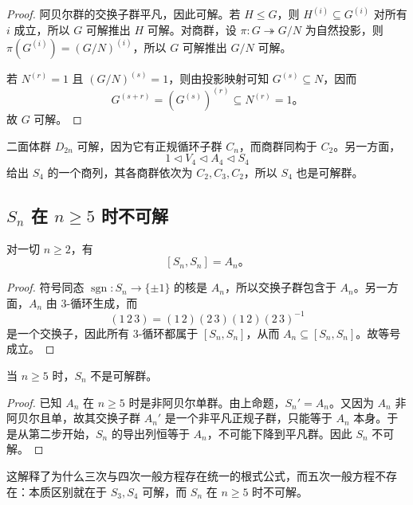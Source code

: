 \begin{proof}
阿贝尔群的交换子群平凡，因此可解。若 $H\le G$，则 $H^{(i)}\subseteq G^{(i)}$ 对所有 $i$ 成立，所以 $G$ 可解推出 $H$ 可解。对商群，设 $\pi:G\twoheadrightarrow G/N$ 为自然投影，则 $\pi(G^{(i)})=(G/N)^{(i)}$，所以 $G$ 可解推出 $G/N$ 可解。

若 $N^{(r)}=1$ 且 $(G/N)^{(s)}=1$，则由投影映射可知 $G^{(s)}\subseteq N$，因而
\[
G^{(s+r)}=(G^{(s)})^{(r)}\subseteq N^{(r)}=1。
\]
故 $G$ 可解。
\end{proof}

\begin{example}
二面体群 $D_{2n}$ 可解，因为它有正规循环子群 $C_n$，而商群同构于 $C_2$。另一方面，
\[
1\lhd V_4\lhd A_4\lhd S_4
\]
给出 $S_4$ 的一个商列，其各商群依次为 $C_2,C_3,C_2$，所以 $S_4$ 也是可解群。
\end{example}

\subsection*{$S_n$ 在 $n\ge5$ 时不可解}

\begin{proposition}
对一切 $n\ge2$，有
\[
[S_n,S_n]=A_n。
\]
\end{proposition}

\begin{proof}
符号同态 $\operatorname{sgn}:S_n\to\{\pm1\}$ 的核是 $A_n$，所以交换子群包含于 $A_n$。另一方面，$A_n$ 由 3-循环生成，而
\[
(1\,2\,3)=(1\,2)(2\,3)(1\,2)(2\,3)^{-1}
\]
是一个交换子，因此所有 3-循环都属于 $[S_n,S_n]$，从而 $A_n\subseteq[S_n,S_n]$。故等号成立。
\end{proof}

\begin{theorem}
当 $n\ge5$ 时，$S_n$ 不是可解群。
\end{theorem}

\begin{proof}
已知 $A_n$ 在 $n\ge5$ 时是非阿贝尔单群。由上命题，$S_n'=A_n$。又因为 $A_n$ 非阿贝尔且单，故其交换子群 $A_n'$ 是一个非平凡正规子群，只能等于 $A_n$ 本身。于是从第二步开始，$S_n$ 的导出列恒等于 $A_n$，不可能下降到平凡群。因此 $S_n$ 不可解。
\end{proof}

\begin{remark}
这解释了为什么三次与四次一般方程存在统一的根式公式，而五次一般方程不存在：本质区别就在于 $S_3,S_4$ 可解，而 $S_n$ 在 $n\ge5$ 时不可解。
\end{remark}

